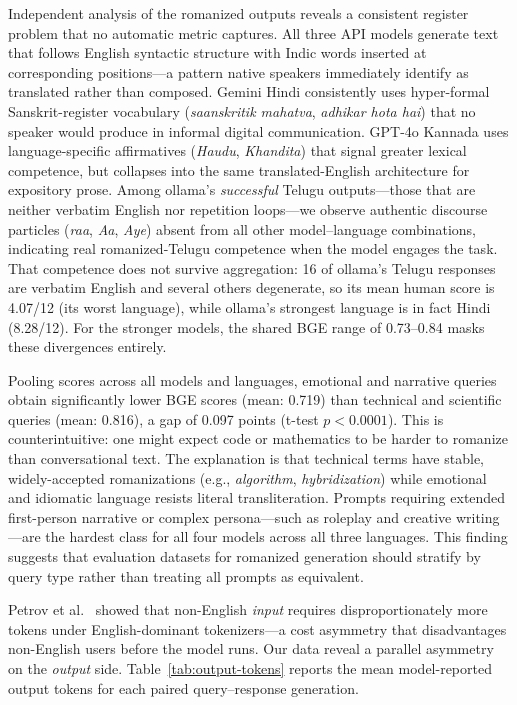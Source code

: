 \enspace
Independent analysis of the romanized outputs reveals a consistent register
problem that no automatic metric captures. All three API models generate text
that follows English syntactic structure with Indic words inserted at
corresponding positions---a pattern native speakers immediately identify as
translated rather than composed. Gemini Hindi consistently uses hyper-formal
Sanskrit-register vocabulary (\textit{saanskritik mahatva}, \textit{adhikar
hota hai}) that no speaker would produce in informal digital communication.
GPT-4o Kannada uses language-specific affirmatives (\textit{Haudu},
\textit{Khandita}) that signal greater lexical competence, but collapses into
the same translated-English architecture for expository prose. Among ollama's \emph{successful} Telugu outputs---those that are neither
verbatim English nor repetition loops---we observe authentic discourse particles
(\textit{raa}, \textit{Aa}, \textit{Aye}) absent from all other model--language
combinations, indicating real romanized-Telugu competence when the model engages
the task. That competence does not survive aggregation: 16 of ollama's Telugu
responses are verbatim English and several others degenerate, so its mean human
score is 4.07/12 (its worst language), while ollama's strongest language is in
fact Hindi (8.28/12). For the stronger models, the shared BGE range of
0.73--0.84 masks these divergences entirely.

\enspace
Pooling scores across all models and languages, emotional and narrative queries
obtain significantly lower BGE scores (mean: 0.719) than technical and
scientific queries (mean: 0.816), a gap of 0.097 points (t-test $p < 0.0001$).
This is counterintuitive: one might expect code or mathematics to be harder
to romanize than conversational text. The explanation is that technical terms
have stable, widely-accepted romanizations (e.g., \textit{algorithm},
\textit{hybridization}) while emotional and idiomatic language resists
literal transliteration. Prompts requiring extended first-person narrative or
complex persona---such as roleplay and creative writing---are the hardest class
for all four models across all three languages. This finding suggests that
evaluation datasets for romanized generation should stratify by query type
rather than treating all prompts as equivalent.

\enspace
Petrov et al.~\cite{petrov2023tokenization} showed that non-English \emph{input}
requires disproportionately more tokens under English-dominant tokenizers---a
cost asymmetry that disadvantages non-English users before the model runs. Our
data reveal a parallel asymmetry on the \emph{output} side. Table~\ref{tab:output-tokens}
reports the mean model-reported output tokens for each paired query--response
generation.

